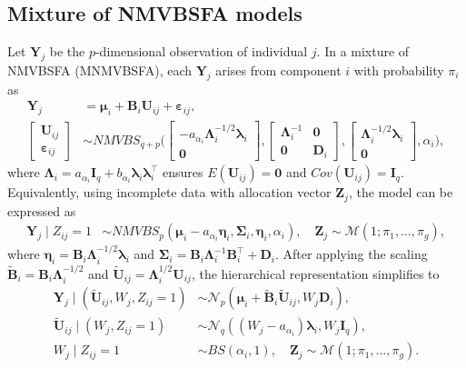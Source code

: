 \documentclass[twoside]{article}
\theoremstyle{definition}
\begin{document}
\subsection{Mixture of NMVBSFA models}
\vspace{-0.5cm}
Let $\bm Y_j$ be the $p$-dimensional observation of individual $j$. In a mixture of NMVBSFA (MNMVBSFA), each $\bm Y_j$ arises from component $i$ with probability $\pi_i$ as
\begin{align}
	\bm Y_j &= \bm\mu_i + \bm B_i \bm U_{ij} + \bm \varepsilon_{ij},\\
	\begin{bmatrix} \bm U_{ij} \\ \bm \varepsilon_{ij} \end{bmatrix} &\sim NMVBS_{q+p}\Bigg(
	\begin{bmatrix} -a_{\alpha_i}\bm\Lambda_i^{-1/2}\bm\lambda_i \\ \bm 0 \end{bmatrix}, 
	\begin{bmatrix} \bm\Lambda_i^{-1} & \bm 0 \\ \bm 0 & \bm D_i \end{bmatrix},
	\begin{bmatrix} \bm\Lambda_i^{-1/2}\bm\lambda_i \\ \bm 0 \end{bmatrix}, \alpha_i
	\Bigg),
\end{align}
where $\bm\Lambda_i = a_{\alpha_i}\bm I_q + b_{\alpha_i} \bm\lambda_i\bm\lambda_i^\top$ ensures $E(\bm U_{ij}) = \bm 0$ and $Cov(\bm U_{ij}) = \bm I_q$. Equivalently, using incomplete data with allocation vector $\bm Z_j$, the model can be expressed as
\begin{align}
	\bm Y_j \mid Z_{ij}=1 &\sim NMVBS_p(\bm\mu_i - a_{\alpha_i}\bm\eta_i, \bm\Sigma_i, \bm\eta_i, \alpha_i),\quad
	\bm Z_j \sim \mathcal{M}(1; \pi_1, \dots, \pi_g),
\end{align}
where $\bm\eta_i = \bm B_i \bm\Lambda_i^{-1/2} \bm\lambda_i$ and $\bm\Sigma_i = \bm B_i \bm\Lambda_i^{-1} \bm B_i^\top + \bm D_i$. After applying the scaling $\tilde{\bm B}_i = \bm B_i \bm\Lambda_i^{-1/2}$ and $\tilde{\bm U}_{ij} = \bm\Lambda_i^{1/2}\bm U_{ij}$, the hierarchical representation simplifies to
\begin{align*}
	\bm Y_j \mid (\tilde{\bm U}_{ij}, W_j, Z_{ij}=1) &\sim \mathcal{N}_p(\bm\mu_i + \tilde{\bm B}_i \tilde{\bm U}_{ij}, W_j \bm D_i),\\
	\tilde{\bm U}_{ij} \mid (W_j, Z_{ij}=1) &\sim \mathcal{N}_q((W_j - a_{\alpha_i})\bm\lambda_i, W_j \bm I_q),\\
	W_j \mid Z_{ij}=1 &\sim BS(\alpha_i, 1), \quad \bm Z_j \sim \mathcal{M}(1; \pi_1, \dots, \pi_g).
\end{align*}
\end{document}
